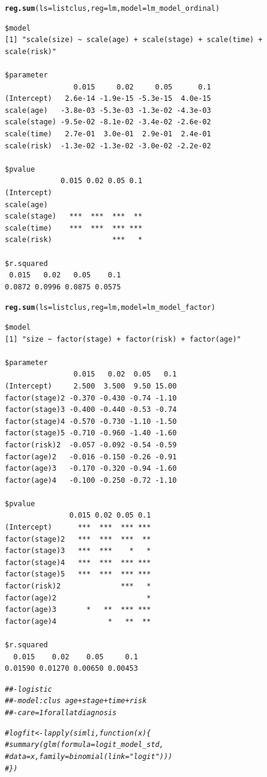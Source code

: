 \documentclass[]{revtex4}\usepackage[]{graphicx}\usepackage[]{color}
\makeatletter
\newcommand{\hlcom}[1]{\textcolor[rgb]{0.678,0.584,0.686}{\textit{#1}}}%
\newcommand{\hlstd}[1]{\textcolor[rgb]{0.345,0.345,0.345}{#1}}%
\newcommand{\hlkwc}[1]{\textcolor[rgb]{0.333,0.667,0.333}{#1}}%
\newcommand{\hlkwd}[1]{\textcolor[rgb]{0.737,0.353,0.396}{\textbf{#1}}}%
\newenvironment{kframe}{%
 \def\at@end@of@kframe{}%
 \ifinner\ifhmode%
  \def\at@end@of@kframe{\end{minipage}}%
  \begin{minipage}{\columnwidth}%
 \fi\fi%
 \def\FrameCommand##1{\hskip\@totalleftmargin \hskip-\fboxsep
 \colorbox{shadecolor}{##1}\hskip-\fboxsep
     \hskip-\linewidth \hskip-\@totalleftmargin \hskip\columnwidth}%
 \MakeFramed {\advance\hsize-\width
   \@totalleftmargin\z@ \linewidth\hsize
   \@setminipage}}%
 {\par\unskip\endMakeFramed%
 \at@end@of@kframe}
\newenvironment{knitrout}{}{} %
\makeatother
\begin{document}
\begin{knitrout}
\color{fgcolor}\begin{kframe}
\begin{alltt}
\hlkwd{reg.sum}\hlstd{(}\hlkwc{ls} \hlstd{= listclus,} \hlkwc{reg} \hlstd{= lm,} \hlkwc{model} \hlstd{= lm_model_ordinal)}
\end{alltt}
\begin{verbatim}
$model
[1] "scale(size) ~ scale(age) + scale(stage) + scale(time) + scale(risk)"

$parameter
                0.015     0.02     0.05      0.1
(Intercept)   2.6e-14 -1.9e-15 -5.3e-15  4.0e-15
scale(age)   -3.8e-03 -5.3e-03 -1.3e-02 -4.3e-03
scale(stage) -9.5e-02 -8.1e-02 -3.4e-02 -2.6e-02
scale(time)   2.7e-01  3.0e-01  2.9e-01  2.4e-01
scale(risk)  -1.3e-02 -1.3e-02 -3.0e-02 -2.2e-02

$pvalue
             0.015 0.02 0.05 0.1
(Intercept)                     
scale(age)                      
scale(stage)   ***  ***  ***  **
scale(time)    ***  ***  *** ***
scale(risk)              ***   *

$r.squared
 0.015   0.02   0.05    0.1 
0.0872 0.0996 0.0875 0.0575 
\end{verbatim}
\begin{alltt}
\hlkwd{reg.sum}\hlstd{(}\hlkwc{ls} \hlstd{= listclus,} \hlkwc{reg} \hlstd{= lm,} \hlkwc{model} \hlstd{= lm_model_factor)}
\end{alltt}
\begin{verbatim}
$model
[1] "size ~ factor(stage) + factor(risk) + factor(age)"

$parameter
                0.015   0.02  0.05   0.1
(Intercept)     2.500  3.500  9.50 15.00
factor(stage)2 -0.370 -0.430 -0.74 -1.10
factor(stage)3 -0.400 -0.440 -0.53 -0.74
factor(stage)4 -0.570 -0.730 -1.10 -1.50
factor(stage)5 -0.710 -0.960 -1.40 -1.60
factor(risk)2  -0.057 -0.092 -0.54 -0.59
factor(age)2   -0.016 -0.150 -0.26 -0.91
factor(age)3   -0.170 -0.320 -0.94 -1.60
factor(age)4   -0.100 -0.250 -0.72 -1.10

$pvalue
               0.015 0.02 0.05 0.1
(Intercept)      ***  ***  *** ***
factor(stage)2   ***  ***  ***  **
factor(stage)3   ***  ***    *   *
factor(stage)4   ***  ***  *** ***
factor(stage)5   ***  ***  *** ***
factor(risk)2              ***   *
factor(age)2                     *
factor(age)3       *   **  *** ***
factor(age)4            *   **  **

$r.squared
  0.015    0.02    0.05     0.1 
0.01590 0.01270 0.00650 0.00453 
\end{verbatim}
\begin{alltt}
\hlcom{##- logistic}
\hlcom{##- model: clus ~ age +  stage + time + risk}
\hlcom{##- care = 1 for all at diagnosis}

\hlcom{# logfit <- lapply(simli , function(x)\{}
\hlcom{#   summary(glm(formula = logit_model_std, }
\hlcom{#               data = x, family = binomial(link = "logit")))}
\hlcom{#   \}) }
\end{alltt}
\end{kframe}
\end{knitrout}
\end{document}
